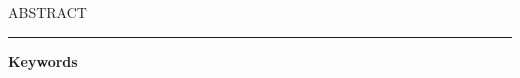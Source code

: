 

\begin{center}
\MakeUppercase{\LARGE{A}\Large{bstract}} \\
\noindent\rule{16cm}{0.4pt}
\end{center}

\large{\textbf{Keywords}}